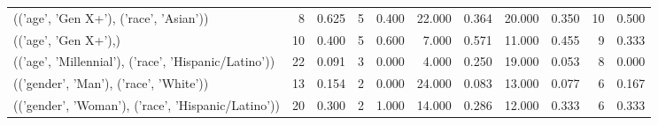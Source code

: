 \begin{tabular}{lrrrrrrrrrr}
(('age', 'Gen X+'), ('race', 'Asian')) & 8 & 0.625 & 5 & 0.400 & 22.000 & 0.364 & 20.000 & 0.350 & 10 & 0.500 \\
(('age', 'Gen X+'),) & 10 & 0.400 & 5 & 0.600 & 7.000 & 0.571 & 11.000 & 0.455 & 9 & 0.333 \\
(('age', 'Millennial'), ('race', 'Hispanic/Latino')) & 22 & 0.091 & 3 & 0.000 & 4.000 & 0.250 & 19.000 & 0.053 & 8 & 0.000 \\
(('gender', 'Man'), ('race', 'White')) & 13 & 0.154 & 2 & 0.000 & 24.000 & 0.083 & 13.000 & 0.077 & 6 & 0.167 \\
(('gender', 'Woman'), ('race', 'Hispanic/Latino')) & 20 & 0.300 & 2 & 1.000 & 14.000 & 0.286 & 12.000 & 0.333 & 6 & 0.333 \\
\bottomrule
\end{tabular}
